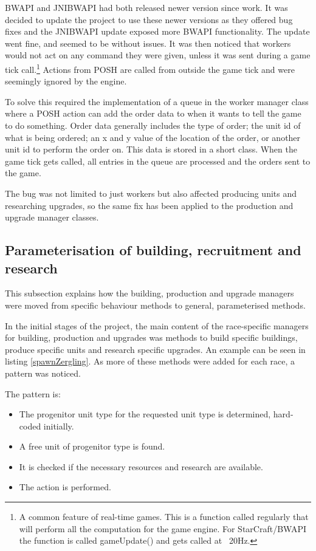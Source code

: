 \documentclass[11pt,openright,a4paper]{report}
\begin{document}
BWAPI and JNIBWAPI had both released newer version since  work. It was decided to update the project to use these newer versions as they offered bug fixes and the JNIBWAPI update exposed more BWAPI functionality. The update went fine, and seemed to be without issues. It was then noticed that workers would not act on any command they were given, unless it was sent during a game tick call.\footnote{A common feature of real-time games. This is a function called regularly that will perform all the computation for the game engine. For StarCraft/BWAPI the function is called gameUpdate() and gets called at ~20Hz.} Actions from POSH are called from outside the game tick and were seemingly ignored by the engine.

To solve this required the implementation of a queue in the worker manager class where a POSH action can add the order data to when it wants to tell the game to do something. Order data generally includes the type of order; the unit id of what is being ordered; an x and y value of the location of the order, or another unit id to perform the order on. This data is stored in a short class. When the game tick gets called, all entries in the queue are processed and the orders sent to the game.

The bug was not limited to just workers but also affected producing units and researching upgrades, so the same fix has been applied to the production and upgrade manager classes.


\subsection{Parameterisation of building, recruitment and research}
This subsection explains how the building, production and upgrade managers were moved from specific behaviour methods to general, parameterised methods.

In the initial stages of the project, the main content of the race-specific managers for building, production and upgrades was methods to build specific buildings, produce specific units and research specific upgrades. An example can be seen in listing \ref{spawnZergling}. As more of these methods were added for each race, a pattern was noticed. 

The pattern is:
\begin{itemize}
\item{The progenitor unit type for the requested unit type is determined, hard-coded initially.}
\item{A free unit of progenitor type is found.}
\item{It is checked if the necessary resources and research are available.}
\item{The action is performed.}
\end{itemize}
\end{document}
